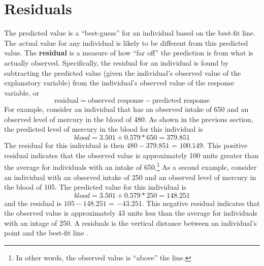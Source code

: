 \documentclass[10pt,openany]{book}\usepackage[]{graphicx}\usepackage[]{color}
\begin{document}

\section{Residuals}
The predicted value is a ``best-guess'' for an individual based on the best-fit line.  The actual value for any individual is likely to be different from this predicted value.  The \textbf{residual} is a measure of how ``far off'' the prediction is from what is actually observed.  Specifically, the residual for an individual is found by subtracting the predicted value (given the individual's observed value of the explanatory variable) from the individual's observed value of the response variable, or
  \[ \text{residual}=\text{observed response}-\text{predicted response} \]
For example, consider an individual that has an observed intake of 650 and an observed level of mercury in the blood of 480.  As shown in the previous section, the predicted level of mercury in the blood for this individual is
  \[ blood = 3.501 + 0.579*650 = 379.851 \]
The residual for this individual is then $480-379.851$ = $100.149$.  This positive residual indicates that the observed value is approximately 100 units greater than the average for individuals with an intake of 650.\footnote{In other words, the observed value is ``above'' the line.}  As a second example, consider an individual with an observed intake of 250 and an observed level of mercury in the blood of 105.  The predicted value for this individual is
  \[ blood = 3.501 + 0.579*250 = 148.251 \]
and the residual is $105-148.251$ = $-43.251$.  This negative residual indicates that the observed value is approximately 43 units less than the average for individuals with an intage of 250.  A residuals is the vertical distance between an individual's point and the best-fit line .

\end{document}
